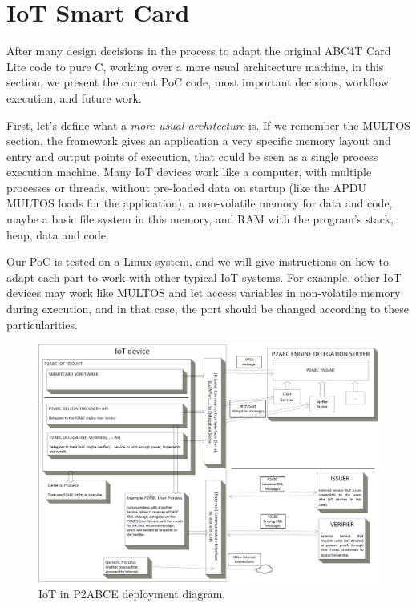 \section{IoT Smart Card}

After many design decisions in the process to adapt the original ABC4T Card Lite code to pure C, working over a more usual architecture machine, in this section, we present the current \ac{PoC} code, most important decisions, workflow execution, and future work.

First, let's define what a \textit{more usual architecture} is. If we remember the MULTOS section, the framework gives an application a very specific memory layout and entry and output points of execution, that could be seen as a single process execution machine. Many IoT devices work like a computer, with multiple processes or threads, without pre-loaded data on startup (like the APDU MULTOS loads for the application), a non-volatile memory for data and code, maybe a basic file system in this memory, and RAM with the program's stack, heap, data and code.

Our PoC is tested on a Linux system, and we will give instructions on how to adapt each part to work with other typical IoT systems.
For example, other IoT devices may work like MULTOS and let access variables in non-volatile memory during execution, and in that case, the port should be changed according to these particularities.


\hfil

\begin{figure}[bth]
	\begin{center}
		\includegraphics[width=\linewidth]{gfx/P2ABCE-IoT-bw}
	\end{center}
	\caption{IoT in P2ABCE deployment diagram.}
	\label{fig:P2ABCE-IoT}
\end{figure}

